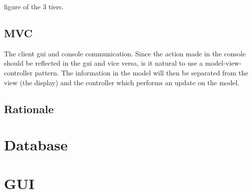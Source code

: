 figure of the 3 tiers. 

\subsection{MVC}

The client gui and console communication. Since the action made in the console should be reflected in the gui and vice versa, is it natural to use a model-view-controller pattern. The information in the model will then be separated from the view (the display) and the controller which performs an update on the model. 


\subsection{Rationale}


\section{Database}
\section{GUI}

